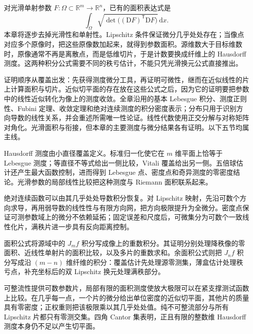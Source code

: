 \ProseParagraphBreak

对光滑单射参数 \(F:\Omega\subset\mathbb R^m\to\mathbb R^n\)，已有的面积表达式是
\[
	\int_\Omega\sqrt{\det\bigl((\mathrm DF)^{\mathsf T}\mathrm DF\bigr)}\,\mathrm dx.
\]
本章将逐步去掉光滑性和单射性。Lipschitz 条件保证微分几乎处处存在；当像点对应多个原像时，把这些原像数加起来，就得到参数面积。源维数大于目标维数时，原像通常不再是离散点，而是低维切片，于是计数要换成纤维上的 Hausdorff 测度。这两种积分公式需要不同的秩亏估计，不能只凭光滑换元公式直接推出。

\ProseParagraphBreak

证明顺序从覆盖出发：先获得测度微分工具，再证明可微性，继而在近似线性的片上计算面积与切片。近似切平面的存在放在这些公式之后，因为它的证明要把参数中的线性近似转化为像上的测度收敛。全章沿用的基本 Lebesgue 积分、测度正则性、Fubini 定理、收敛定理和绝对连续测度的积分密度表示；分布只用于识别方向导数的线性关系，并会重述所需唯一性论证。线性代数使用正交分解与对称矩阵对角化。光滑面积与衔接，但本章的主要测度与微分结果各有证明。以下五节均属主线。







\begin{chaptersummary}
	Hausdorff 测度由小直径覆盖定义。标准归一化使它在 \(m\) 维平面上恰等于 Lebesgue 测度；等直径不等式给出一侧比较，Vitali 覆盖给出另一侧。五倍球估计还产生最大函数控制，进而得到 Lebesgue 点、密度点和奇异测度的零密度结论。光滑参数的局部线性比较把这种测度与 Riemann 面积联系起来。

	\ProseParagraphBreak

	绝对连续函数可以由其几乎处处导数积分恢复。对 Lipschitz 映射，先沿可数个方向求导，再用弱导数的线性性与有限方向网，把方向极限提升为全微分。密度点保证可测参数域上的微分不依赖延拓；固定误差和尺度后，可微集分为可数个一致线性化片，满秩片进一步具有反向距离控制。

	\ProseParagraphBreak

	面积公式将源域中的 \(J_mf\) 积分写成像上的重数积分。其证明分别处理降秩像的零面积、近线性单射片的面积比较，以及多片的重数求和。余面积公式则把 \(J_nf\) 积分写成沿 \((m-n)\) 维纤维的积分：覆盖估计先处理源零测集，薄盒估计处理秩亏点，补充坐标后的双 Lipschitz 换元处理满秩部分。

	\ProseParagraphBreak

	可整流性提供可数参数片，局部有限的面积测度使放大极限可以在紧支撑测试函数上比较。在几乎每一点，一个片的微分给出单位密度的近似切平面，其他片的质量具有零密度；正权重则把该极限乘以其几乎处处值。纯不可整流部分与所有 Lipschitz 片都只有零测交集。四角 Cantor 集表明，正且有限的整数维 Hausdorff 测度本身仍不足以产生切平面。
\end{chaptersummary}

